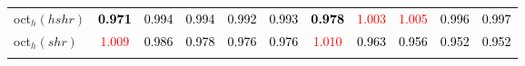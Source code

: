 \begin{tabular}[t]{l|>{}cccc>{}c|ccccc}
oct$_h(hshr)$ & \textcolor{black}{\textbf{0.971}} & \textcolor{black}{0.994} & \textcolor{black}{0.994} & \textcolor{black}{0.992} & \textcolor{black}{0.993} & \textcolor{black}{\textbf{0.978}} & \textcolor{red}{1.003} & \textcolor{red}{1.005} & \textcolor{black}{0.996} & \textcolor{black}{0.997}\\
oct$_h(shr)$ & \textcolor{red}{1.009} & \textcolor{black}{0.986} & \textcolor{black}{0.978} & \textcolor{black}{0.976} & \textcolor{black}{0.976} & \textcolor{red}{1.010} & \textcolor{black}{0.963} & \textcolor{black}{0.956} & \textcolor{black}{0.952} & \textcolor{black}{0.952}\\
\bottomrule
{}\\
\end{tabular}
